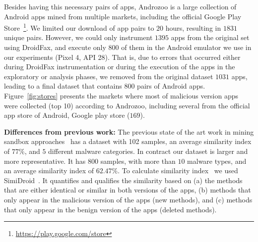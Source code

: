 Besides having this necessary pairs of apps, Androzoo is a large collection of Android apps mined from multiple markets, including the official Google Play Store~\footnote{\url{https://play.google.com/store}}. We limited our download of app pairs to $20$ hours, resulting in $1831$ unique pairs. However, we could only instrument $1395$ apps from the original set using DroidFax, and execute only $800$ of them in the Android emulator we use in our experiments (Pixel 4, API 28). That is, due to errors that occurred either during DroidFax instrumentation or during the execution of the apps in the exploratory or analysis phases, we removed from the original dataset $1031$ apps, leading to a final dataset that contains $800$ pairs of Android apps. Figure~\ref{fig:stores} presents the markets where most of malicious version apps were collected (top 10) according to Androzoo, including several from the official app store of Android, Google play store ($169$).



\textbf{Differences from previous work: } The previous state of the art work in mining sandbox approaches~\cite{DBLP:conf/wcre/BaoLL18} has a dataset with 102 samples, an average similarity index of $77\%$, and $5$ different malware categories. In contract our dataset is larger and more representative. It has 800 samples, with more than $10$ malware types, and an average similarity index of $62.47\%$. To calculate similarity index~\cite{DBLP:conf/wcre/0029BKT16} we used SimiDroid~\cite{DBLP:conf/trustcom/0029BK17}. It quantifies and qualifies the similarity based on (a) the methods that are either identical or similar in both versions of the apps, (b) methods that only appear in the malicious version of the apps (new methods), and (c) methods that only appear in the benign version of the apps (deleted methods).




